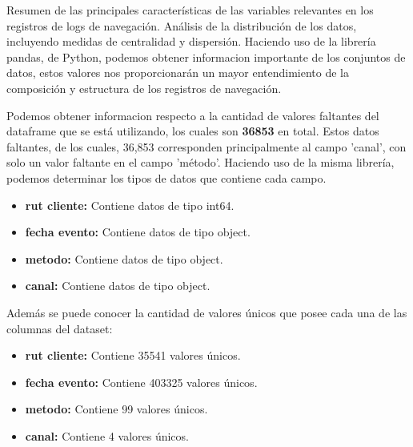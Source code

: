 Resumen de las principales características de las variables relevantes en los registros de logs de navegación.
Análisis de la distribución de los datos, incluyendo medidas de centralidad y dispersión. Haciendo uso de la librería pandas, de Python, podemos obtener informacion importante de los conjuntos de datos, estos valores nos proporcionarán un mayor entendimiento de la composición y estructura de los registros de navegación.

Podemos obtener informacion respecto a la cantidad de valores faltantes del dataframe que se está utilizando, los cuales son \textbf{36853} en total. Estos datos faltantes, de los cuales, 36,853 corresponden principalmente al campo 'canal', con solo un valor faltante en el campo 'método'. Haciendo uso de la misma librería, podemos determinar los tipos de datos que contiene cada campo.

\begin{itemize}
    \item \textbf{rut cliente:} Contiene datos de tipo int64.
    \item \textbf{fecha evento:} Contiene datos de tipo object.
    \item \textbf{metodo:} Contiene datos de tipo object.
    \item \textbf{canal:} Contiene datos de tipo object.
\end{itemize}

Además se puede conocer la cantidad de valores únicos que posee cada una de las columnas del dataset:

\begin{itemize}
    \item \textbf{rut cliente:} Contiene 35541 valores únicos.
    \item \textbf{fecha evento:} Contiene 403325 valores únicos.
    \item \textbf{metodo:} Contiene 99 valores únicos.
    \item \textbf{canal:} Contiene 4 valores únicos.
\end{itemize}





